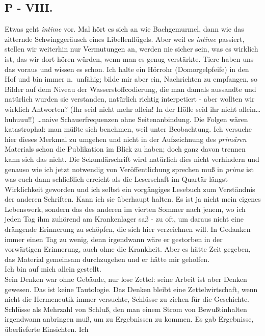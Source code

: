 \documentclass[
]{article}
\author{}
\date{\vspace{-2.5em}}
\begin{document}
\subsection{P - VIII.}\label{p---viii.}

Etwas geht \emph{intime} vor. Mal hört es sich an wie Bachgemurmel, dann
wie das zitternde Schwinggeräusch eines Libellenflügels. Aber weil es
\emph{intime} passiert, stellen wir weiterhin nur Vermutungen an, werden
nie sicher sein, was es wirklich ist, das wir dort hören würden, wenn
man es genug verstärkte. Tiere haben uns das voraus und wissen es schon.
Ich halte ein Hörrohr (Domorgelpfeife) in den Hof und bin immer
n.~unfähig; bilde mir aber ein, Nachrichten zu empfangen, so Bilder auf
dem Niveau der Wasserstoffcodierung, die man damals aussandte und
natürlich wurden sie verstanden, natürlich richtig interpetiert - aber
wollten wir wirklich Antworten? (Ihr seid nicht mehr allein! In der
Hölle seid ihr nicht allein\ldots huhuuu!!) \ldots naive
Schauerfrequenzen ohne Seitenanbindung. Die Folgen wären katastrophal:
man müßte sich benehmen, weil unter Beobachtung. Ich versuche hier
dieses Merkmal zu umgehen und nicht in der Aufzeichnung des
\emph{primären} Materials schon die Publikation im Blick zu haben; doch
ganz davon trennen kann sich das nicht. Die Sekundärschrift wird
natürlich dies nicht verhindern und genauso wie ich jetzt notwendig von
Veröffentlichung sprechen muß in \emph{prima} ist was euch dann
schließlich erreicht als die Leserschaft im Quartär längst Wirklichkeit
geworden und ich selbst ein vorgängiges Lesebuch zum Verständnis der
anderen Schriften. Kann ich sie überhaupt halten. Es ist ja nicht mein
eigenes Lebenswerk, sondern das des anderen im vierten Sommer nach
jenem, wo ich jeden Tag ihm zuhörend am Krankenlager saß - zu oft, um
daraus nicht eine drängende Erinnerung zu schöpfen, die sich hier
verzeichnen will. In Gedanken immer einen Tag zu wenig, denn irgendwann
wäre er gestorben in der vorwärtigen Erinnerung, auch ohne die
Krankheit. Aber es hätte Zeit gegeben, das Material gemeinsam
durchzugehen und er hätte mir geholfen.\\
Ich bin auf mich allein gestellt.\\
Sein Denken war ohne Gebäude, nur lose Zettel: seine Arbeit ist aber
Denken gewesen. Das ist keine Tautologie. Das Denken bleibt eine
Zettelwirtschaft, wenn nicht die Hermeneutik immer versuchte, Schlüsse
zu ziehen für die Geschichte. Schlüsse als Mehrzahl von Schluß, den man
einem Strom von Bewußtinhalten irgendwann anbringen muß, um zu
Ergebnissen zu kommen. Es gab Ergebnisse, überlieferte Einsichten. Ich
\end{document}
